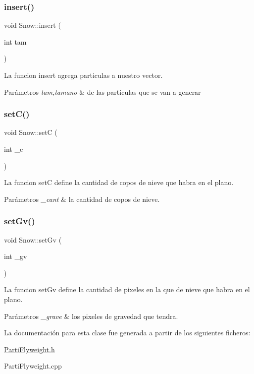 \subsubsection{\texorpdfstring{insert()}{insert()}}
{\footnotesize\ttfamily void Snow\+::insert (\begin{DoxyParamCaption}\item[{int}]{tam }\end{DoxyParamCaption})}

La funcion insert agrega particulas a nuestro vector. 
\begin{DoxyParams}{Parámetros}
{\em tam,tamano} & de las particulas que se van a generar \\
\hline
\end{DoxyParams}
\mbox{\label{classSnow_a3cabcbee15d87f551d90be472f1865c4}} 
\subsubsection{\texorpdfstring{set\+C()}{setC()}}
{\footnotesize\ttfamily void Snow\+::setC (\begin{DoxyParamCaption}\item[{int}]{\+\_\+c }\end{DoxyParamCaption})}

La funcion setC define la cantidad de copos de nieve que habra en el plano. 
\begin{DoxyParams}{Parámetros}
{\em \+\_\+cant} & la cantidad de copos de nieve. \\
\hline
\end{DoxyParams}
\mbox{\label{classSnow_a7b77940da35738cd518c5c66d04350cf}} 
\subsubsection{\texorpdfstring{set\+Gv()}{setGv()}}
{\footnotesize\ttfamily void Snow\+::set\+Gv (\begin{DoxyParamCaption}\item[{int}]{\+\_\+gv }\end{DoxyParamCaption})}

La funcion set\+Gv define la cantidad de pixeles en la que de nieve que habra en el plano. 
\begin{DoxyParams}{Parámetros}
{\em \+\_\+grave} & los pixeles de gravedad que tendra. \\
\hline
\end{DoxyParams}


La documentación para esta clase fue generada a partir de los siguientes ficheros\+:\begin{DoxyCompactItemize}
\item 
\hyperlink{PartiFlyweight_8h}{Parti\+Flyweight.\+h}\item 
Parti\+Flyweight.\+cpp\end{DoxyCompactItemize}
